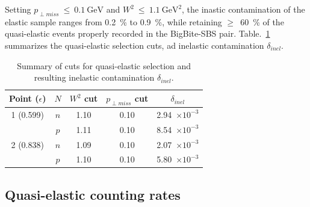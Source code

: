 Setting $p_{\perp miss}~\leq~0.1~\mathrm{GeV}$ and $W^2~\leq~1.1~\mathrm{GeV}^2$, the inastic contamination of the elastic sample ranges from 0.2~\% to 0.9~\%, while retaining $\geq$~60~\% of the quasi-elastic events properly recorded in the BigBite-SBS pair.
Table.~\ref{tab:contam} summarizes the quasi-elastic selection cuts, ad inelastic contamination $\delta_{inel}$.
%
\begin{center}
\begin{table}[h]
\begin{tabular}{|c|c|c|c|c|}
\hline
Point ($\epsilon$) & $N$ & $W^2$ cut & $p_{\perp miss}$ cut & $\delta_{inel}$ \\
\hline
1 (0.599) & $n$ & 1.10 & 0.10 & 2.94~$\times 10^{-3}$ \\
 & $p$ & 1.11 & 0.10 & 8.54~$\times 10^{-3}$ \\
\hline
2 (0.838) & $n$ & 1.09 & 0.10 & 2.07~$\times 10^{-3}$ \\
 & $p$ & 1.10 & 0.10 & 5.80~$\times 10^{-3}$ \\
\hline
\end{tabular} 
\caption{Summary of cuts for quasi-elastic selection and resulting inelastic contamination $\delta_{inel}$.}
\label{tab:contam}
\end{table}
\end{center}
%

\subsection{Quasi-elastic counting rates}

